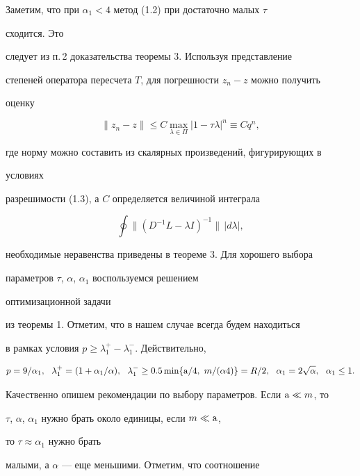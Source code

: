  


Заметим, что при $\alpha_1<4$ метод (1.2) при достаточно малых $\tau$ 


сходится. Это 


следует из п.\,2 доказательства теоремы 3. Используя представление 


степеней оператора пересчета $T$, для погрешности $z_n-z$ можно получить 


оценку 


$$ 


\|z_n-z\|\le C\max_{\lambda\in\Pi}|1-\tau\lambda|^n\equiv C q^n, 


$$ 


где норму можно составить из скалярных произведений, фигурирующих в 


условиях 


разрешимости (1.3), а $C$ определяется величиной интеграла 


$$ 


\oint\|(D^{-1}L-\lambda I)^{-1}\|\,|d\lambda|, 


$$ 


необходимые неравенства приведены в теореме 3. Для хорошего выбора 


параметров $\tau$, $\alpha$, $\alpha_1$ воспользуемся решением 


оптимизационной задачи 


из теоремы 1. Отметим, что в нашем случае всегда будем находиться 


в рамках условия $p\ge\lambda^+_1-\lambda^-_1$. Действительно, 


\begin{equation} 


p=9/\alpha_1,\ \ \lambda^+_1=(1+\alpha_1/\alpha), 


\ \ \lambda^-_1\ge0.5\min\{\A/4,\ m/(\alpha4)\}=R/2, 


\ \ \alpha_1=2\sqrt{\alpha},\ \ \alpha_1\le1. 


\end{equation} 


 


Качественно опишем рекомендации по выбору параметров. Если $\mathrm a\ll m$, то 


$\tau$, $\alpha$, $\alpha_1$ нужно брать около единицы, если $m\ll\mathrm a$, 


то $\tau\approx\alpha_1$ нужно брать 


малыми, а $\alpha$ --- еще меньшими. Отметим, что соотношение 


